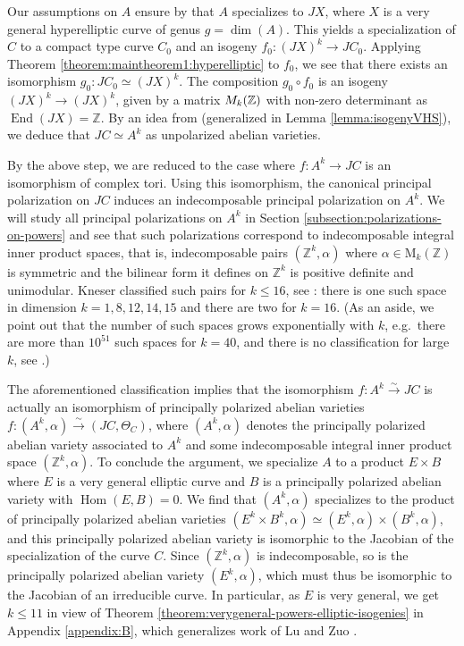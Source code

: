 \documentclass[a4paper,11pt,reqno]{amsart}
\numberwithin{equation}{section}
\theoremstyle{plain}
\theoremstyle{definition}
\newcommand{\Z}{\mathbb Z}
\let\rm\relax
\newcommand{\rm}[1]{{\mathrm{#1}}}
\newcommand{\Hom}{\operatorname{Hom}}
\newcommand{\End}{\operatorname{End}}
\renewcommand{\cong}{\simeq}
\begin{document}
Our assumptions on $A$ ensure by \cite{collino-fanofundamentalgroup} that $A$ specializes to $JX$, where $X$ is a very general hyperelliptic curve of genus $g=\dim(A)$. This yields a specialization of $C$ to a compact type curve $C_0$ and an isogeny $f_0 \colon (JX)^k \to JC_0$. 
Applying Theorem \ref{theorem:maintheorem1:hyperelliptic} to $f_0$, we see that there exists an isomorphism $g_0 \colon JC_0 \cong (JX)^k$. The composition $g_0 \circ f_0$ is an isogeny $(JX)^k \to (JX)^k$, given by a matrix $\rm{M}_k(\Z)$ with non-zero determinant as $\End(JX) =\Z$. By an idea from \cite{bardellipirola-curvesofgenusg} (generalized in Lemma \ref{lemma:isogenyVHS}), we deduce that $JC \cong A^k$ as unpolarized abelian varieties. 

By the above step, we are reduced to the case where $f\colon A^k \to JC$ is an isomorphism of complex tori.
Using this isomorphism, the canonical principal polarization on $JC$ induces an indecomposable principal polarization on $A^k$.
We will study all principal polarizations on $A^k$ in Section \ref{subsection:polarizations-on-powers} and see that such polarizations correspond to indecomposable integral inner product spaces, that is, indecomposable pairs  $(\Z^k,\alpha)$ where $\alpha \in \mathrm{M}_k(\Z)$ is symmetric and the bilinear form it defines on $\Z^k$ is positive definite and unimodular. Kneser classified such pairs for $k\leq 16$, see \cite{kneser-quadratisch}: there is one such space  in dimension $k=1,8,12,14,15$ and there are two for $k=16$.
 (As an aside, we point out that the number of such spaces grows exponentially with $k$, e.g.\ there are more than $10^{51}$ such spaces for $k=40$, and there is no classification for large $k$, see \cite[p.\ 28, Remark 1]{milnorhusemoller}.)

The aforementioned classification implies that the isomorphism $f \colon A^k \xrightarrow{\sim}JC$ is actually an isomorphism of principally polarized abelian varieties $f \colon (A^k, \alpha) \xrightarrow{\sim} (JC, \Theta_C)$, where $(A^k,\alpha)$ denotes the principally polarized abelian variety associated to $A^k$ and some indecomposable integral inner product space $(\Z^k,\alpha)$. 
To conclude the argument, we specialize $A$ to a product $E\times B$ where $E$ is a very general elliptic curve and $B$ is a principally polarized abelian variety with $\Hom(E,B)=0$. 
We find that $(A^k, \alpha)$ specializes to the product of principally polarized abelian varieties $(E^k\times B^k,\alpha)\cong (E^k,\alpha)\times (B^k,\alpha)$, and this principally polarized abelian variety is isomorphic to the Jacobian of the specialization of the curve $C$. 
Since $(\Z^k,\alpha)$ is indecomposable, so is the principally polarized abelian variety $(E^k,\alpha)$, which must thus be isomorphic to the Jacobian of an irreducible curve. 
In particular, as $E$ is very general, we get $k\leq 11$ in view of Theorem \ref{theorem:verygeneral-powers-elliptic-isogenies} in Appendix \ref{appendix:B}, which generalizes work of Lu and Zuo \cite{luzuo-shimuracurves}.
 
\end{document}
